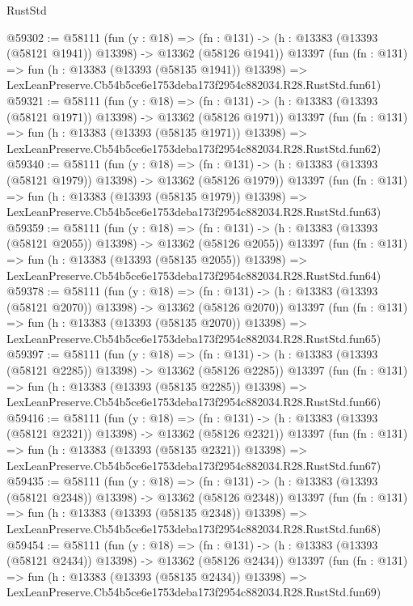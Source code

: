 \begin{lexlean}{RustStd}
\begin{coremodule}
@59302 := @58111
    (fun (y : @18) =>
    (fn : @131) -> (h : @13383 (@13393 (@58121 @1941)) @13398) -> @13362 (@58126 @1941))
    @13397
    (fun (fn : @131) =>
    fun (h : @13383 (@13393 (@58135 @1941)) @13398) =>
    LexLeanPreserve.Cb54b5ce6e1753deba173f2954c882034.R28.RustStd.fun61)
@59321 := @58111
    (fun (y : @18) =>
    (fn : @131) -> (h : @13383 (@13393 (@58121 @1971)) @13398) -> @13362 (@58126 @1971))
    @13397
    (fun (fn : @131) =>
    fun (h : @13383 (@13393 (@58135 @1971)) @13398) =>
    LexLeanPreserve.Cb54b5ce6e1753deba173f2954c882034.R28.RustStd.fun62)
@59340 := @58111
    (fun (y : @18) =>
    (fn : @131) -> (h : @13383 (@13393 (@58121 @1979)) @13398) -> @13362 (@58126 @1979))
    @13397
    (fun (fn : @131) =>
    fun (h : @13383 (@13393 (@58135 @1979)) @13398) =>
    LexLeanPreserve.Cb54b5ce6e1753deba173f2954c882034.R28.RustStd.fun63)
@59359 := @58111
    (fun (y : @18) =>
    (fn : @131) -> (h : @13383 (@13393 (@58121 @2055)) @13398) -> @13362 (@58126 @2055))
    @13397
    (fun (fn : @131) =>
    fun (h : @13383 (@13393 (@58135 @2055)) @13398) =>
    LexLeanPreserve.Cb54b5ce6e1753deba173f2954c882034.R28.RustStd.fun64)
@59378 := @58111
    (fun (y : @18) =>
    (fn : @131) -> (h : @13383 (@13393 (@58121 @2070)) @13398) -> @13362 (@58126 @2070))
    @13397
    (fun (fn : @131) =>
    fun (h : @13383 (@13393 (@58135 @2070)) @13398) =>
    LexLeanPreserve.Cb54b5ce6e1753deba173f2954c882034.R28.RustStd.fun65)
@59397 := @58111
    (fun (y : @18) =>
    (fn : @131) -> (h : @13383 (@13393 (@58121 @2285)) @13398) -> @13362 (@58126 @2285))
    @13397
    (fun (fn : @131) =>
    fun (h : @13383 (@13393 (@58135 @2285)) @13398) =>
    LexLeanPreserve.Cb54b5ce6e1753deba173f2954c882034.R28.RustStd.fun66)
@59416 := @58111
    (fun (y : @18) =>
    (fn : @131) -> (h : @13383 (@13393 (@58121 @2321)) @13398) -> @13362 (@58126 @2321))
    @13397
    (fun (fn : @131) =>
    fun (h : @13383 (@13393 (@58135 @2321)) @13398) =>
    LexLeanPreserve.Cb54b5ce6e1753deba173f2954c882034.R28.RustStd.fun67)
@59435 := @58111
    (fun (y : @18) =>
    (fn : @131) -> (h : @13383 (@13393 (@58121 @2348)) @13398) -> @13362 (@58126 @2348))
    @13397
    (fun (fn : @131) =>
    fun (h : @13383 (@13393 (@58135 @2348)) @13398) =>
    LexLeanPreserve.Cb54b5ce6e1753deba173f2954c882034.R28.RustStd.fun68)
@59454 := @58111
    (fun (y : @18) =>
    (fn : @131) -> (h : @13383 (@13393 (@58121 @2434)) @13398) -> @13362 (@58126 @2434))
    @13397
    (fun (fn : @131) =>
    fun (h : @13383 (@13393 (@58135 @2434)) @13398) =>
    LexLeanPreserve.Cb54b5ce6e1753deba173f2954c882034.R28.RustStd.fun69)

\end{coremodule}
\end{lexlean}
